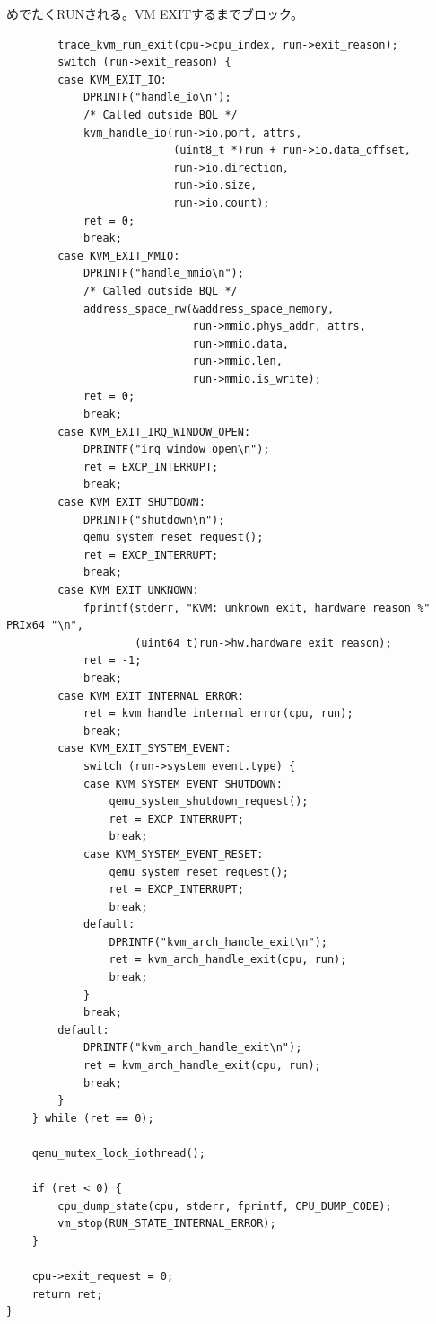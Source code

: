 ﻿\documentclass[9pt,b5paper,tombo,openany]{jsbook}
\begin{document}
めでたくRUNされる。VM EXITするまでブロック。

\begin{lstlisting}
        trace_kvm_run_exit(cpu->cpu_index, run->exit_reason);
        switch (run->exit_reason) {
        case KVM_EXIT_IO:
            DPRINTF("handle_io\n");
            /* Called outside BQL */
            kvm_handle_io(run->io.port, attrs,
                          (uint8_t *)run + run->io.data_offset,
                          run->io.direction,
                          run->io.size,
                          run->io.count);
            ret = 0;
            break;
        case KVM_EXIT_MMIO:
            DPRINTF("handle_mmio\n");
            /* Called outside BQL */
            address_space_rw(&address_space_memory,
                             run->mmio.phys_addr, attrs,
                             run->mmio.data,
                             run->mmio.len,
                             run->mmio.is_write);
            ret = 0;
            break;
        case KVM_EXIT_IRQ_WINDOW_OPEN:
            DPRINTF("irq_window_open\n");
            ret = EXCP_INTERRUPT;
            break;
        case KVM_EXIT_SHUTDOWN:
            DPRINTF("shutdown\n");
            qemu_system_reset_request();
            ret = EXCP_INTERRUPT;
            break;
        case KVM_EXIT_UNKNOWN:
            fprintf(stderr, "KVM: unknown exit, hardware reason %" PRIx64 "\n",
                    (uint64_t)run->hw.hardware_exit_reason);
            ret = -1;
            break;
        case KVM_EXIT_INTERNAL_ERROR:
            ret = kvm_handle_internal_error(cpu, run);
            break;
        case KVM_EXIT_SYSTEM_EVENT:
            switch (run->system_event.type) {
            case KVM_SYSTEM_EVENT_SHUTDOWN:
                qemu_system_shutdown_request();
                ret = EXCP_INTERRUPT;
                break;
            case KVM_SYSTEM_EVENT_RESET:
                qemu_system_reset_request();
                ret = EXCP_INTERRUPT;
                break;
            default:
                DPRINTF("kvm_arch_handle_exit\n");
                ret = kvm_arch_handle_exit(cpu, run);
                break;
            }
            break;
        default:
            DPRINTF("kvm_arch_handle_exit\n");
            ret = kvm_arch_handle_exit(cpu, run);
            break;
        }
    } while (ret == 0);

    qemu_mutex_lock_iothread();

    if (ret < 0) {
        cpu_dump_state(cpu, stderr, fprintf, CPU_DUMP_CODE);
        vm_stop(RUN_STATE_INTERNAL_ERROR);
    }

    cpu->exit_request = 0;
    return ret;
}
\end{lstlisting}
\end{document}
